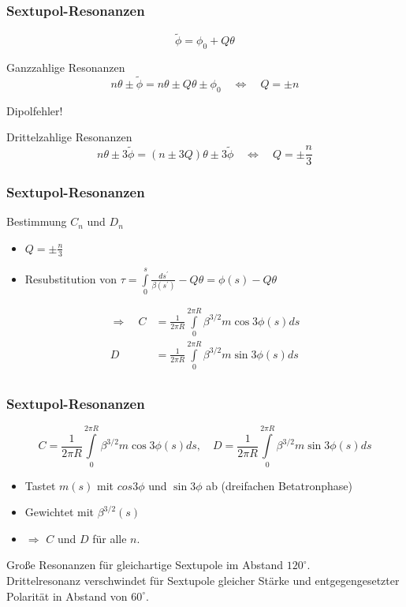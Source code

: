 \documentclass[hyperref={pdfpagelabels=false}]{beamer}
\begin{document}
\begin{frame}
\frametitle{Sextupol-Resonanzen}
\begin{equation*}
\tilde{\phi} = \phi_0 + Q\theta
\end{equation*}

Ganzzahlige Resonanzen 
\begin{equation*}
n\theta \pm \tilde{\phi} = n\theta \pm Q\theta \pm \phi_0 \quad \Leftrightarrow \quad Q = \pm n
\end{equation*}
\begin{flushright}
Dipolfehler!
\end{flushright}


Drittelzahlige Resonanzen
\begin{equation*}
n\theta \pm 3\tilde{\phi} = (n\pm 3Q) \theta \pm 3\tilde{\phi}\quad \Leftrightarrow \quad Q = \pm \frac{n}{3}
\end{equation*}
\end{frame}

\begin{frame}
\frametitle{Sextupol-Resonanzen}
Bestimmung  $C_n$ und $D_n$
\begin{itemize}
\item $Q = \pm \frac{n}{3}\quad$
\item Resubstitution von $\tau = \int\limits_0^s\frac{ds^\prime}{\beta(s^\prime)}-Q\theta = \phi(s) - Q\theta$
\end{itemize}\pause
\begin{align*}
\Rightarrow \quad C &= \frac{1}{2\pi R} \int\limits_0^{2\pi R} \beta^{3/2} m \cos3\phi(s) ds\\
D &= \frac{1}{2\pi R} \int\limits_0^{2\pi R} \beta^{3/2} m \sin3\phi(s) ds\\
\end{align*}

\end{frame}

\begin{frame}
\frametitle{Sextupol-Resonanzen}
\begin{equation*}
C = \frac{1}{2\pi R} \int\limits_0^{2\pi R} \beta^{3/2} m \cos3\phi(s) ds,\quad D = \frac{1}{2\pi R} \int\limits_0^{2\pi R} \beta^{3/2} m \sin3\phi(s) ds
\end{equation*}
\begin{itemize}
\item Tastet $m(s)$ mit $cos 3\phi$ und $\sin 3\phi$ ab (dreifachen Betatronphase)
\item Gewichtet mit $\beta^{3/2}(s)$
\item $\Rightarrow$ $C$ und $D$ für alle $n$.
\end{itemize}
\pause
Große Resonanzen für gleichartige Sextupole im Abstand $120^\circ$.\\\pause
Drittelresonanz verschwindet für Sextupole gleicher Stärke und entgegengesetzter Polarität in Abstand von $60^\circ$.
\end{frame}
\end{document}
